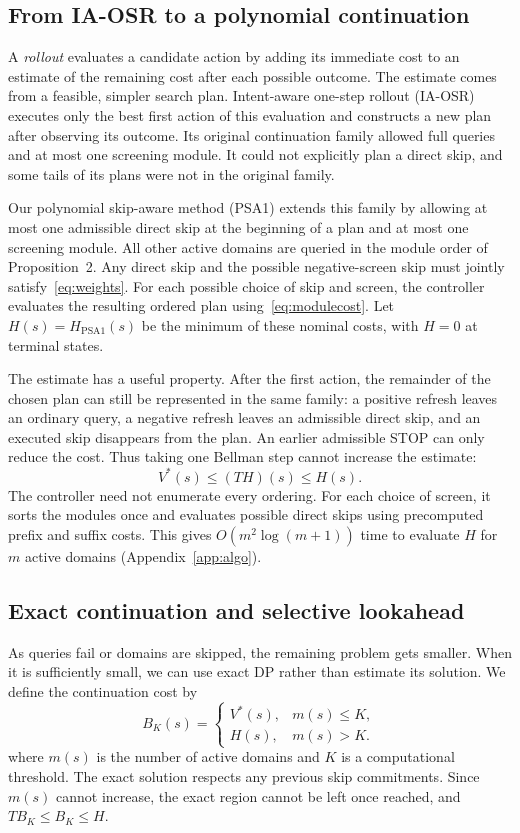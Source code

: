 \documentclass[conference]{IEEEtran}
\begin{document}
\subsection{From IA-OSR to a polynomial continuation}
A \emph{rollout} evaluates a candidate action by adding its immediate cost to an estimate of the remaining cost after each possible outcome. The estimate comes from a feasible, simpler search plan. Intent-aware one-step rollout (IA-OSR) executes only the best first action of this evaluation and constructs a new plan after observing its outcome. Its original continuation family allowed full queries and at most one screening module. It could not explicitly plan a direct skip, and some tails of its plans were not in the original family.

Our polynomial skip-aware method (PSA1) extends this family by allowing at most one admissible direct skip at the beginning of a plan and at most one screening module. All other active domains are queried in the module order of Proposition~2. Any direct skip and the possible negative-screen skip must jointly satisfy~\eqref{eq:weights}. For each possible choice of skip and screen, the controller evaluates the resulting ordered plan using~\eqref{eq:modulecost}. Let $H(s)=H_{\mathrm{PSA1}}(s)$ be the minimum of these nominal costs, with $H=0$ at terminal states.

The estimate has a useful property. After the first action, the remainder of the chosen plan can still be represented in the same family: a positive refresh leaves an ordinary query, a negative refresh leaves an admissible direct skip, and an executed skip disappears from the plan. An earlier admissible STOP can only reduce the cost. Thus taking one Bellman step cannot increase the estimate:
\begin{equation}
 V^*(s)\le (TH)(s)\le H(s).
 \label{eq:baseupper}
\end{equation}
The controller need not enumerate every ordering. For each choice of screen, it sorts the modules once and evaluates possible direct skips using precomputed prefix and suffix costs. This gives $O(m^2\log(m+1))$ time to evaluate $H$ for $m$ active domains (Appendix~\ref{app:algo}).

\subsection{Exact continuation and selective lookahead}
As queries fail or domains are skipped, the remaining problem gets smaller. When it is sufficiently small, we can use exact DP rather than estimate its solution. We define the continuation cost by
\begin{equation}
 B_K(s)=\begin{cases}V^*(s),&m(s)\le K,\\ H(s),&m(s)>K.\end{cases}
 \label{eq:tail}
\end{equation}
where $m(s)$ is the number of active domains and $K$ is a computational threshold. The exact solution respects any previous skip commitments. Since $m(s)$ cannot increase, the exact region cannot be left once reached, and $TB_K\le B_K\le H$.
\end{document}
